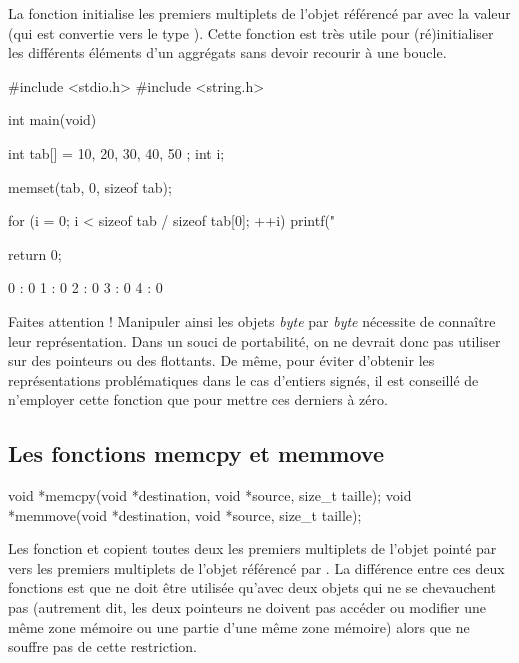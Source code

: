 La fonction  initialise les  premiers
multiplets de l'objet référencé par  avec la valeur
 (qui est convertie vers le type ).
Cette fonction est très utile pour (ré)initialiser les différents
éléments d'un aggrégats sans devoir recourir à une boucle.

\begin{C}
#include <stdio.h>
#include <string.h>


int main(void)
{
    int tab[] = { 10, 20, 30, 40, 50 };
    int i;

    memset(tab, 0, sizeof tab);

    for (i = 0; i < sizeof tab / sizeof tab[0]; ++i)
        printf("%

    return 0;
}
\end{C}

\begin{C}
0 : 0
1 : 0
2 : 0
3 : 0
4 : 0
\end{C}

\begin{erreurbox}
  Faites attention ! Manipuler ainsi les
objets \emph{byte} par \emph{byte} nécessite de connaître leur
représentation. Dans un souci de portabilité, on ne devrait donc pas
utiliser  sur des pointeurs ou des flottants. De même,
pour éviter d'obtenir les représentations problématiques dans le cas
d'entiers signés, il est conseillé de n'employer cette fonction que pour
mettre ces derniers à zéro.
\end{erreurbox}


\subsection{Les fonctions memcpy et memmove}
\label{les-fonctions-memcpy-et-memmove}

\begin{C}
void *memcpy(void *destination, void *source, size_t taille);
void *memmove(void *destination, void *source, size_t taille);
\end{C}

Les fonction  et  copient toutes deux
les  premiers multiplets de l'objet pointé par
 vers les premiers multiplets de l'objet référencé par
. La différence entre ces deux fonctions est que
 ne doit être utilisée qu'avec deux objets qui ne se
chevauchent pas (autrement dit, les deux pointeurs ne doivent pas
accéder ou modifier une même zone mémoire ou une partie d'une même zone
mémoire) alors que  ne souffre pas de cette
restriction.

